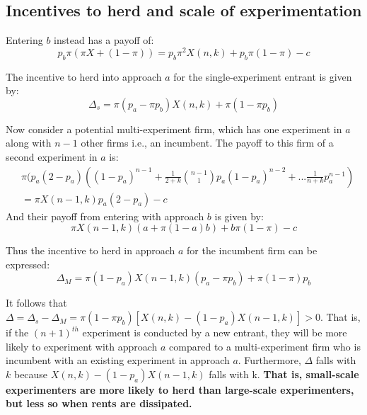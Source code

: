 \subsection{Incentives to herd and scale of experimentation}
\noindent Entering $b$ instead has a payoff of:
\begin{equation} \label{eq: n in A B}
    p_b \pi \left(\pi X + (1-\pi)\right) = p_b\pi^2 X(n,k)  + p_b \pi(1-\pi) -c
\end{equation}

\noindent The incentive to herd into approach $a$ for the single-experiment entrant is given by:
\begin{equation}\label{eq herd small n}
 \Delta_s =  \pi(p_a-\pi p_b)X(n, k) + \pi(1-\pi p_b)
\end{equation}


\noindent Now consider a potential multi-experiment firm, which has one experiment in $a$ along with $n-1$ other firms i.e., an incumbent. The payoff to this firm of a second experiment in $a$ is:
\begin{equation} \label{eq: n in A A big}
\begin{aligned}
     &\pi(p_a(2-p_a) \left((1-p_a)^{n-1} + \frac{1}{2+k}{n-1 \choose 1}p_a(1-p_a)^{n-2} + ... \frac{1}{n + k}p_a^{n-1} \right) \\ 
     &=  \pi X(n-1,k)p_a(2-p_a) - c
\end{aligned}
\end{equation}
\noindent And their payoff from entering with approach $b$ is given by:
\begin{equation} \label{eq: n in A B }
\pi X(n-1,k)(a +\pi (1-a)b)+ b\pi(1-\pi)-c    
\end{equation}

\noindent Thus the incentive to herd in approach $a$ for the incumbent firm can be expressed:
\begin{equation}\label{eq herd large n}
   \Delta_M = \pi (1-p_a)X(n-1, k)(p_a-\pi p_b) + \pi (1-\pi)p_b
\end{equation}

\noindent It follows that $\Delta = \Delta_s - \Delta_M = \pi (1-\pi p_b) \left[X(n,k)-(1-p_a)X(n-1,k) \right] > 0$. That is, if the $(n+1)^{th}$ experiment is conducted by a new entrant, they will be more likely to experiment with approach $a$ compared to a multi-experiment firm who is incumbent with an existing experiment in approach $a$. Furthermore, $\Delta$ falls with $k$ because $X(n,k)-(1-p_a)X(n-1,k)$ falls with k. \textbf{That is, small-scale experimenters are more likely to herd than large-scale experimenters, but less so when rents are dissipated.}  



